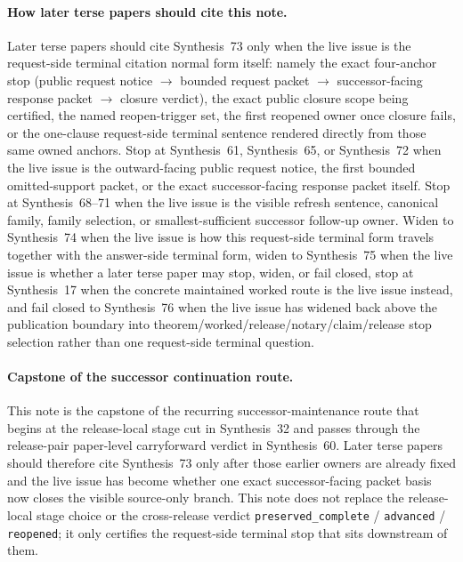 \documentclass[11pt]{article}
\begin{document}
\paragraph{How later terse papers should cite this note.}
Later terse papers should cite Synthesis~73 only when the live issue is the request-side terminal citation normal form itself: namely the exact four-anchor stop (public request notice $\to$ bounded request packet $\to$ successor-facing response packet $\to$ closure verdict), the exact public closure scope being certified, the named reopen-trigger set, the first reopened owner once closure fails, or the one-clause request-side terminal sentence rendered directly from those same owned anchors. Stop at Synthesis~61, Synthesis~65, or Synthesis~72 when the live issue is the outward-facing public request notice, the first bounded omitted-support packet, or the exact successor-facing response packet itself. Stop at Synthesis~68--71 when the live issue is the visible refresh sentence, canonical family, family selection, or smallest-sufficient successor follow-up owner. Widen to Synthesis~74 when the live issue is how this request-side terminal form travels together with the answer-side terminal form, widen to Synthesis~75 when the live issue is whether a later terse paper may stop, widen, or fail closed, stop at Synthesis~17 when the concrete maintained worked route is the live issue instead, and fail closed to Synthesis~76 when the live issue has widened back above the publication boundary into theorem/worked/release/notary/claim/release stop selection rather than one request-side terminal question.\cite{series:publicrequestnotices,series:publicrequestresponsepackets,series:publicrequestresponsepacketrefreshnotices,series:publicrequestresponsepacketrefreshnoticenormalforms,series:publicrequestresponsepacketrefreshnoticeselections,series:publicrequestresponsepacketrefreshresponsemenus,series:publicrequestresponsepacketrefreshresponsepackets,series:pairedterminalcitationdiscipline,series:pairedterminalcutoverrule,series:workedexample,series:theoremtopublicationspine}

\paragraph{Capstone of the successor continuation route.}
This note is the capstone of the recurring successor-maintenance route that begins at the release-local stage cut in Synthesis~32 and passes through the release-pair paper-level carryforward verdict in Synthesis~60. Later terse papers should therefore cite Synthesis~73 only after those earlier owners are already fixed and the live issue has become whether one exact successor-facing packet basis now closes the visible source-only branch. This note does not replace the release-local stage choice or the cross-release verdict \texttt{preserved\_complete} / \texttt{advanced} / \texttt{reopened}; it only certifies the request-side terminal stop that sits downstream of them.\cite{series:releasespine,series:publicrequestcarryforward}
\end{document}
